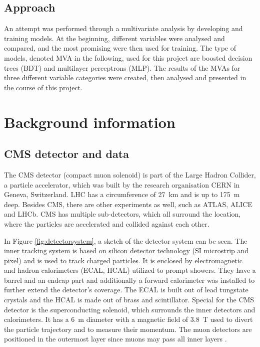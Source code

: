 \documentclass[11pt]{scrartcl}
\begin{document}
	\subsection{Approach}
	\label{sec:approach}
		An attempt was performed through a multivariate analysis by developing and training models. At the beginning, different variables were analysed and compared, and the most promising were then used for training. The type of models, denoted MVA in the following, used for this project are boosted decision trees (BDT) and multilayer perceptrons (MLP). The results of the MVAs for three different variable categories were created, then analysed and presented in the course of this project.

\section{Background information}
	\subsection{CMS detector and data}
	The CMS detector (compact muon solenoid) is part of the Large Hadron Collider, a particle accelerator, which was built by the research organisation CERN in Geneva, Switzerland. LHC has a circumference of 27~km and is up to 175~m deep. Besides CMS, there are other experiments as well, such as ATLAS, ALICE and LHCb. CMS has multiple sub-detectors, which all surround the location, where the particles are accelerated and collided against each other.
	
	In Figure \ref{fig:detectorsystem}, a sketch of the detector system can be seen. The inner tracking system is based on silicon detector technology (SI microstrip and pixel) and is used to track charged particles. It is enclosed by electromagnetic and hadron calorimeters (ECAL, HCAL) utilized to prompt showers. They have a barrel and an endcap part and additionally a forward calorimeter was installed to further extend the detector's coverage. The ECAL is built out of lead tungstate crystals and the HCAL is made out of brass and scintillator. Special for the CMS detector is the superconducting solenoid, which surrounds the inner detectors and calorimeters. It has a 6~m diameter with a magnetic field of 3.8~T used to divert the particle trajectory and to measure their momentum. The muon detectors are positioned in the outermost layer since muons may pass all inner layers \cite{TTG, CMS21, CMS08}.
	
\end{document}
